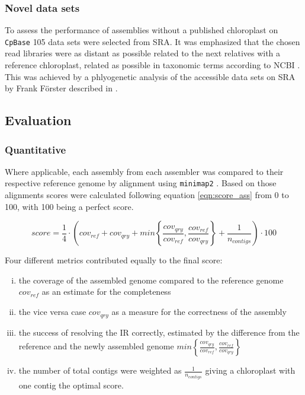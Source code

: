 \subsubsection{Novel data sets}

To assess the performance of assemblies without a published chloroplast on \texttt{CpBase}
\cite{cpbase} 105 data sets were selected from SRA. It was emphasized that the chosen read
libraries were as distant as possible related to the next relatives with a reference
chloroplast, related as possible in taxonomic terms according to NCBI
\cite{ncbitaxonomy}. This was achieved by a phlyogenetic analysis of the accessible data
sets on SRA by Frank F\"orster described in \cite{freudenthal2019landscape}.

\subsection{Evaluation}
\subsubsection{Quantitative}
Where applicable, each assembly from each assembler was compared to their respective
reference genome by alignment using \texttt{minimap2} \cite{li2018minimap2}. Based on
those alignments scores were calculated following equation \ref{eqn:score_ass} from 0 to
100, with 100 being a perfect score.

\begin{equation}
  score = \frac{1}{4} \cdot \left( cov_{ref} +  cov_{qry} + min\left\{ \frac{cov_{qry}}{cov_{ref}}, \frac{cov_{ref}}{cov_{qry}}\right\} + \frac{1}{n_{contigs} }\right) \cdot 100
  \label{eqn:score_ass}
\end{equation}

Four different metrics contributed equally to the final score:

\begin{enumerate}[(i)]
\item the coverage of the assembled genome compared to the reference genome $cov_{ref}$ as
  an estimate for the completeness
\item the vice versa case $cov_{qry}$ as a measure for the correctness of the assembly 
\item the success of resolving the IR correctly, estimated by the difference from the
  reference and the newly assembled genome
  $min\left\{ \frac{cov_{qry}}{cov_{ref}}, \frac{cov_{ref}}{cov_{qry}}\right\}$
\item the number of total contigs were weighted as $\frac{1}{n_{contigs}}$ giving a
  chloroplast with one contig the optimal score.
\end{enumerate}

